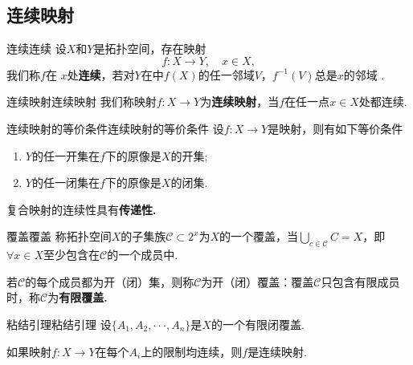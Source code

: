 \documentclass{ctexart}
\begin{document}
\subsection{连续映射}
\begin{定义}{连续}{连续}
	设$X$和$Y$是拓扑空间，存在映射$$f:X \rightarrow Y,\quad x\in X, $$
	我们称$f$在 $x$处\textbf{连续}，若对$Y$在中$f(X)$的任一邻域$V$，$f^{-1}(V)$总是$x$的邻域 .
\end{定义}
\begin{定义}{连续映射}{连续映射}
	我们称映射$f:X\rightarrow Y$为\textbf{连续映射}，当$f$在任一点$x\in X$处都连续.
\end{定义}
\begin{定理}{连续映射的等价条件}{连续映射的等价条件}
	设$f:X \rightarrow Y$是映射，则有如下等价条件
	\begin{enumerate}[label=(\arabic*)]
		\item $Y$的任一开集在$f$下的原像是$X$的开集;
		\item $Y$的任一闭集在$f$下的原像是$X$的闭集.
	\end{enumerate}
\end{定理}
\begin{提醒}
	复合映射的连续性具有\textbf{传递性.}
\end{提醒}
\begin{定义}{覆盖}{覆盖}
	 称拓扑空间$X$的子集族$\mathscr{C}\subset2^{x}$为$X$的一个覆盖，当$\displaystyle\bigcup_{c\in\mathscr{C}}C=X$，即$\forall x \in X$至少包含在$\mathscr{C}$的一个成员中.
\end{定义}
\begin{注意}
	若$\mathscr{C}$的每个成员都为开（闭）集，则称$\mathscr{C}$为开（闭）覆盖：覆盖$\mathscr{C}$只包含有限成员时，称$\mathscr{C}$为\textbf{有限覆盖.}
\end{注意}
\begin{定理}{粘结引理}{粘结引理}
	设$\{A_1,A_2,\cdotp\cdotp\cdotp,A_n\}$是$X$的一个有限闭覆盖.
	
	如果映射$f:X \rightarrow Y$在每个$A_i$上的限制均连续，则$f$是连续映射.
\end{定理}
\end{document}
